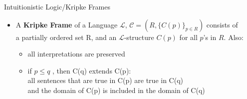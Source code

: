 \documentclass{beamer}
\begin{document}
\def\forcingExampleiIII{%
\begin{tikzpicture}
\node (root) at (0,0) {\scriptsize{$\langle \{c_1\},\{ \} \rangle$ }};

\node (n1) at (0,-1) {\scriptsize{$\langle \{c_1\},\{\phi \} \rangle$ }};

\draw[-] (root) -- (n1);
\end{tikzpicture}
}




\def\forcingExampleii{%
    
\begin{tikzpicture}

\node (root) at (0,0) {\scriptsize{$\langle \{c_1\},\{ P(c_1)\} \rangle$ }};

\node (n1) at (0,-1) {\scriptsize{$\langle \{c_1,c_2\},\{P(c_1), P(c_2) \} \rangle$ }};

\node (n2) at (0,-2) {\scriptsize{$\langle \{c_1,c_2,c_3\},\{P(c_1), P(c_2) \} \rangle$ }};


\draw[-] (root) -- (n1);
\draw[-] (n2) -- (n1);
\end{tikzpicture}

}



\begin{frame}{Intuitionistic Logic/Kripke Frames}


        \begin{itemize}
        \item A \textbf{Kripke Frame} of a Language \(\mathcal{L}\),   \(\mathcal{C} = (R, \{C(p)\}_{p \in R})\) consists of \\a partially ordered set R, and an \(\mathcal{L}\)-structure \(C(p)\) for all \(p\)'s in \(R\). Also:
        \begin{itemize}
            \item all interpretations are preserved
            \item if $p \leq q$ , then C(q) extends C(p): \\ all sentences that are true in C(p) are true in C(q) \\
            and the domain of C(p) is included in the domain of C(q)
        \end{itemize}
        \end{itemize}
    \end{frame}    
\end{document}
